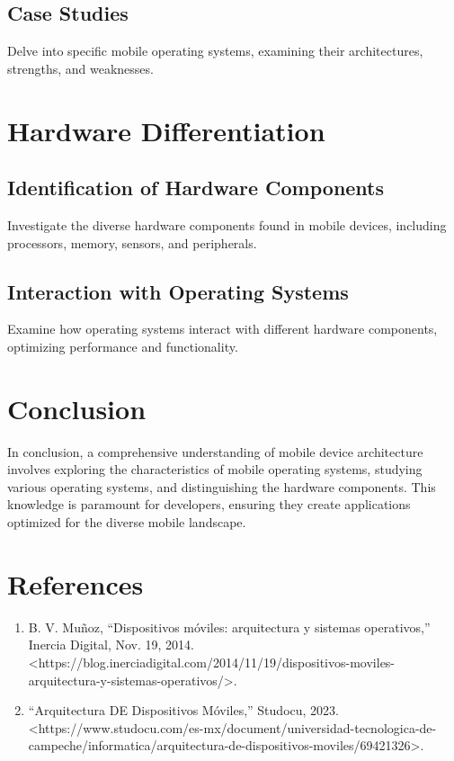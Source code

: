 \documentclass{article}
\begin{document}
	\subsection{Case Studies}
	Delve into specific mobile operating systems, examining their architectures, strengths, and weaknesses.
	
	\section{Hardware Differentiation}
	\subsection{Identification of Hardware Components}
	Investigate the diverse hardware components found in mobile devices, including processors, memory, sensors, and peripherals.
	
	\subsection{Interaction with Operating Systems}
	Examine how operating systems interact with different hardware components, optimizing performance and functionality.
	
	\section{Conclusion}
	In conclusion, a comprehensive understanding of mobile device architecture involves exploring the characteristics of mobile operating systems, studying various operating systems, and distinguishing the hardware components. This knowledge is paramount for developers, ensuring they create applications optimized for the diverse mobile landscape.
	
	\section{References}
	\begin{enumerate}
		\item B. V. Muñoz, “Dispositivos móviles: arquitectura y sistemas operativos,” Inercia Digital, Nov. 19, 2014. \textless https://blog.inerciadigital.com/2014/11/19/dispositivos-moviles-arquitectura-y-sistemas-operativos/\textgreater.
		\item “Arquitectura DE Dispositivos Móviles,” Studocu, 2023. \textless https://www.studocu.com/es-mx/document/universidad-tecnologica-de-campeche/informatica/arquitectura-de-dispositivos-moviles/69421326\textgreater.
	\end{enumerate}
	
\end{document}
